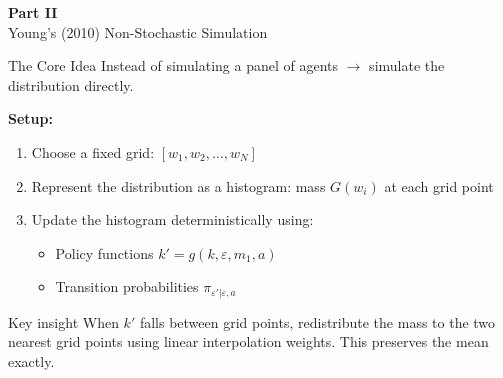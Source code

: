 \documentclass[aspectratio=169,11pt]{beamer}
\newcommand{\emphc}[1]{\textcolor{harvardcrimson}{#1}}
\begin{document}

\begin{frame}{}
\vfill
\begin{center}
{\Huge \textcolor{uzhblue}{\textbf{Part II}}}\\[12pt]
{\LARGE Young's (2010) Non-Stochastic Simulation}
\end{center}
\vfill
\end{frame}

\begin{frame}{The Core Idea}
Instead of simulating a \emphc{panel of agents} $\longrightarrow$ simulate the \emphc{distribution} directly.

\vspace{0.5em}
\textbf{Setup:}
\begin{enumerate}
    \item Choose a \emphc{fixed grid}: $[w_1, w_2, \ldots, w_N]$
    \item Represent the distribution as a \emphc{histogram}: mass $G(w_i)$ at each grid point
    \item Update the histogram \emphc{deterministically} using:
    \begin{itemize}
        \item Policy functions $k' = g(k, \varepsilon, m_1, a)$
        \item Transition probabilities $\pi_{\varepsilon' | \varepsilon, a}$
    \end{itemize}
\end{enumerate}

\vspace{0.5em}
\begin{block}{Key insight}
When $k'$ falls between grid points, \emphc{redistribute the mass} to the two nearest grid points using linear interpolation weights. This preserves the mean exactly.
\end{block}
\end{frame}
\end{document}
